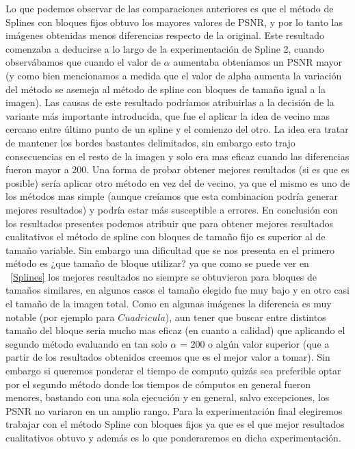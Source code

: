\documentclass[a4paper]{article}
\begin{document}
Lo que podemos observar de las comparaciones anteriores es que el método de Splines con bloques fijos obtuvo los mayores valores de PSNR, y por lo tanto las imágenes obtenidas menos diferencias respecto de la original. Este resultado comenzaba a deducirse a lo largo  de la experimentación de Spline 2, cuando observábamos que cuando el valor de $\alpha$ aumentaba obteníamos un PSNR mayor (y como bien mencionamos a medida que el valor de alpha aumenta la variación del método se asemeja al método de spline con bloques de tamaño igual a la imagen). Las causas de este resultado podríamos atribuirlas a la decisión de la variante m\'as importante introducida, que fue el aplicar la idea de vecino mas cercano entre último punto de un spline y el comienzo del otro. La idea era tratar de mantener los bordes bastantes delimitados, sin embargo esto trajo consecuencias en el resto de la imagen y solo era mas eficaz cuando las diferencias fueron mayor a 200. Una forma de probar obtener mejores resultados (si es que es posible) ser\'ia aplicar otro método en vez del de vecino, ya que el mismo es uno de los métodos mas simple (aunque creíamos que esta combinacion podría generar mejores resultados) y podría estar m\'as susceptible a errores.
En conclusión con los resultados presentes podemos atribuir que para obtener mejores resultados cualitativos el método de spline con bloques de tamaño fijo es superior al de tamaño variable. Sin embargo una dificultad que se nos presenta en el primero método es ¿que tamaño de bloque utilizar? ya que como se puede ver en ~\ref{Splines} los mejores resultados no siempre se obtuvieron para bloques de tamaños similares, en algunos casos el tamaño elegido fue muy bajo y en otro casi el tamaño de la imagen total. Como en algunas imágenes la diferencia es muy notable (por ejemplo para $Cuadricula$), aun tener que buscar entre distintos tamaño del bloque seria mucho mas eficaz (en cuanto a calidad) que aplicando el segundo método evaluando en tan solo $\alpha$ = 200 o algún valor superior (que a partir de los resultados obtenidos creemos que es el mejor valor a tomar). Sin embargo si queremos ponderar el tiempo de computo quizás sea preferible optar por el segundo método donde los tiempos de cómputos en general fueron menores, bastando con una sola ejecución y en general, salvo excepciones, los PSNR no variaron en un amplio rango.
Para la experimentación final elegiremos trabajar con el método Spline con bloques fijos ya que es el que mejor resultados cualitativos obtuvo y además es lo que ponderaremos en dicha experimentación.   
\end{document}
